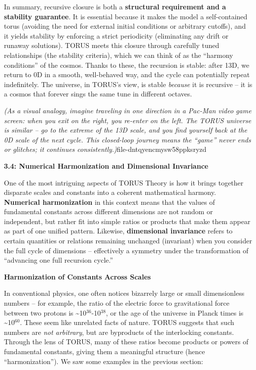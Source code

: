 \documentclass[]{article}
\newcommand{\superscript}[1]{\ensuremath{^{\mathrm{#1}}}}
\begin{document}
In summary, recursive closure is both a \textbf{structural requirement
and a stability guarantee}. It is essential because it makes the model a
self-contained torus (avoiding the need for external initial conditions
or arbitrary cutoffs), and it yields stability by enforcing a strict
periodicity (eliminating any drift or runaway solutions). TORUS meets
this closure through carefully tuned relationships (the stability
criteria), which we can think of as the ``harmony conditions'' of the
cosmos. Thanks to these, the recursion is stable: after 13D, we return
to 0D in a smooth, well-behaved way, and the cycle can potentially
repeat indefinitely. The universe, in TORUS's view, is stable
\emph{because} it is recursive -- it is a cosmos that forever sings the
same tune in different octaves.

\emph{(As a visual analogy, imagine traveling in one direction in a
Pac-Man video game screen: when you exit on the right, you re-enter on
the left. The TORUS universe is similar -- go to the extreme of the 13D
scale, and you find yourself back at the 0D scale of the next cycle.
This closed-loop journey means the ``game'' never ends or glitches; it
continues consistently.)}​file-dntqyencmysw58ppksryzd

\textbf{3.4: Numerical Harmonization and Dimensional Invariance}

One of the most intriguing aspects of TORUS Theory is how it brings
together disparate scales and constants into a coherent mathematical
harmony. \textbf{Numerical harmonization} in this context means that the
values of fundamental constants across different dimensions are not
random or independent, but rather fit into simple ratios or products
that make them appear as part of one unified pattern. Likewise,
\textbf{dimensional invariance} refers to certain quantities or
relations remaining unchanged (invariant) when you consider the full
cycle of dimensions -- effectively a symmetry under the transformation
of ``advancing one full recursion cycle.''

\textbf{Harmonization of Constants Across Scales}

In conventional physics, one often notices bizarrely large or small
dimensionless numbers -- for example, the ratio of the electric force to
gravitational force between two protons is
\textasciitilde{}10\superscript{36}-10\superscript{38}, or the age of the universe in Planck
times is \textasciitilde{}10\superscript{60}. These seem like unrelated facts of
nature. TORUS suggests that such numbers are \emph{not arbitrary}, but
are byproducts of the interlocking constants. Through the lens of TORUS,
many of these ratios become products or powers of fundamental constants,
giving them a meaningful structure (hence ``harmonization''). We saw
some examples in the previous section:
\end{document}
